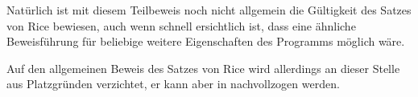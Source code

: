             Natürlich ist mit diesem Teilbeweis noch nicht allgemein die Gültigkeit des Satzes von Rice bewiesen,
            auch wenn schnell ersichtlich ist,
            dass eine ähnliche Beweisführung für beliebige weitere Eigenschaften des Programms möglich wäre.

            Auf den allgemeinen Beweis des Satzes von Rice wird allerdings an dieser Stelle aus Platzgründen verzichtet,
            er kann aber in
            \cite[181-185]{Kuske2011} nachvollzogen werden.



